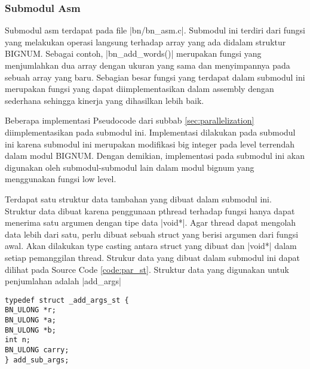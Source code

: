 \subsubsection{Submodul Asm} \label{sec:bn_asm}
  Submodul asm terdapat pada file |bn/bn_asm.c|. Submodul ini terdiri dari fungsi yang melakukan operasi langsung terhadap array yang ada didalam struktur BIGNUM. Sebagai contoh, |bn_add_words()| merupakan fungsi yang menjumlahkan dua array dengan ukuran yang sama dan menyimpannya pada sebuah array yang baru. Sebagian besar fungsi yang terdapat dalam submodul ini merupakan fungsi yang dapat diimplementasikan dalam assembly dengan sederhana sehingga kinerja yang dihasilkan lebih baik.

  Beberapa implementasi Pseudocode dari subbab \ref{sec:parallelization} diimplementasikan pada submodul ini. Implementasi dilakukan pada submodul ini karena submodul ini merupakan modifikasi big integer pada level terrendah dalam modul BIGNUM. Dengan demikian, implementasi pada submodul ini akan digunakan oleh submodul-submodul lain dalam modul bignum yang menggunakan fungsi low level.

  Terdapat satu struktur data tambahan yang dibuat dalam submodul ini. Struktur data dibuat karena penggunaan pthread terhadap fungsi hanya dapat menerima satu argumen dengan tipe data |void*|. Agar thread dapat mengolah data lebih dari satu, perlu dibuat sebuah struct yang berisi argumen dari fungsi awal. Akan dilakukan type casting antara struct yang dibuat dan |void*| dalam setiap pemanggilan thread. Strukur data yang dibuat dalam submodul ini dapat dilihat pada Source Code \ref{code:par_st}. Struktur data yang digunakan untuk penjumlahan adalah |add_args|

  \begin{lstlisting}[caption={Struktur Data add\_sub\_args}, label={code:par_st}]
typedef struct _add_args_st {
BN_ULONG *r;
BN_ULONG *a;
BN_ULONG *b;
int n;
BN_ULONG carry;
} add_sub_args;
  \end{lstlisting}


